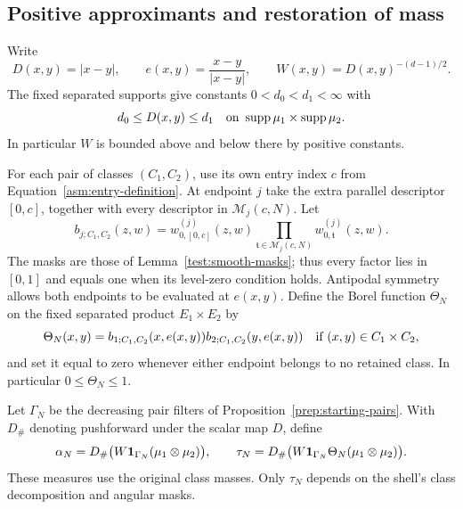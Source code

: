 \subsection{Positive approximants and restoration of mass}

Write
\[
 D(x,y)=|x-y|,\qquad e(x,y)=\frac{x-y}{|x-y|},\qquad
 W(x,y)=D(x,y)^{-(d-1)/2}.
\]
The fixed separated supports give constants $0<d_0<d_1<\infty$ with
\begin{equation}
 \label{asm:distance-range}
 d_0\le D(x,y)\le d_1
 \quad\hbox{on }\operatorname{supp}\mu_1\times\operatorname{supp}\mu_2.
\end{equation}
In particular $W$ is bounded above and below there by positive constants.

For each pair of classes $(C_1,C_2)$, use its own entry index $c$ from
Equation~\eqref{asm:entry-definition}.  At endpoint $j$ take the extra
parallel descriptor $[0,c]$, together with every descriptor in
$\mathcal M_j(c,N)$.  Let
\begin{equation}
 \label{asm:endpoint-mask}
 b_{j;C_1,C_2}(z,w)
 =w^{(j)}_{0,[0,c]}(z,w)
                  \prod_{\mathfrak t\in\mathcal M_j(c,N)}
                         w^{(j)}_{0,\mathfrak t}(z,w).
\end{equation}
The masks are those of Lemma~\ref{test:smooth-masks}; thus every factor
lies in $[0,1]$ and equals one when its level-zero condition holds.
Antipodal symmetry allows both endpoints to be evaluated at $e(x,y)$.
Define the Borel function $\Theta_N$ on the fixed separated product
$E_1\times E_2$ by
\[
 \Theta_N(x,y)=
 b_{1;C_1,C_2}(x,e(x,y))
 b_{2;C_1,C_2}(y,e(x,y))
 \quad\hbox{if }(x,y)\in C_1\times C_2,
\]
and set it equal to zero whenever either endpoint belongs to no retained
class.
In particular $0\le\Theta_N\le1$.

Let $\Gamma_N$ be the decreasing pair filters of
Proposition~\ref{prep:starting-pairs}.  With $D_\#$ denoting pushforward
under the scalar map $D$, define
\begin{equation}
 \label{asm:measures}
 \alpha_N=D_\#\bigl(W\mathbf 1_{\Gamma_N}
                          (\mu_1\otimes\mu_2)\bigr),\qquad
 \tau_N=D_\#\bigl(W\mathbf 1_{\Gamma_N}\Theta_N
                          (\mu_1\otimes\mu_2)\bigr).
\end{equation}
These measures use the original class masses.  Only $\tau_N$ depends on
the shell's class decomposition and angular masks.

